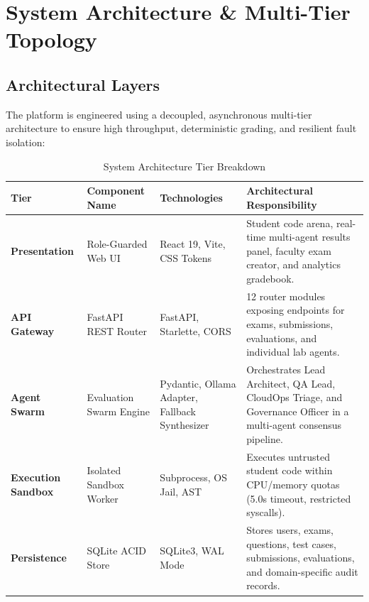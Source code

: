 \documentclass[12pt, a4paper]{report}
\begin{document}
\chapter{System Architecture \& Multi-Tier Topology}

\section{Architectural Layers}
The platform is engineered using a decoupled, asynchronous multi-tier architecture to ensure high throughput, deterministic grading, and resilient fault isolation:

\begin{table}[H]
\centering
\caption{System Architecture Tier Breakdown}
\renewcommand{\arraystretch}{1.2}
\small
\begin{tabular}{|L{2.5cm}|L{3.2cm}|L{3.0cm}|L{6.8cm}|}
\hline
{}
\color{white}\textbf{Tier} & \color{white}\textbf{Component Name} & \color{white}\textbf{Technologies} & \color{white}\textbf{Architectural Responsibility} \\
\hline
\textbf{Presentation} & Role-Guarded Web UI & React 19, Vite, CSS Tokens & Student code arena, real-time multi-agent results panel, faculty exam creator, and analytics gradebook. \\
\hline
{}
\textbf{API Gateway} & FastAPI REST Router & FastAPI, Starlette, CORS & 12 router modules exposing endpoints for exams, submissions, evaluations, and individual lab agents. \\
\hline
\textbf{Agent Swarm} & Evaluation Swarm Engine & Pydantic, Ollama Adapter, Fallback Synthesizer & Orchestrates Lead Architect, QA Lead, CloudOps Triage, and Governance Officer in a multi-agent consensus pipeline. \\
\hline
{}
\textbf{Execution Sandbox} & Isolated Sandbox Worker & Subprocess, OS Jail, AST & Executes untrusted student code within CPU/memory quotas (5.0s timeout, restricted syscalls). \\
\hline
\textbf{Persistence} & SQLite ACID Store & SQLite3, WAL Mode & Stores users, exams, questions, test cases, submissions, evaluations, and domain-specific audit records. \\
\hline
\end{tabular}
\end{table}
\end{document}
